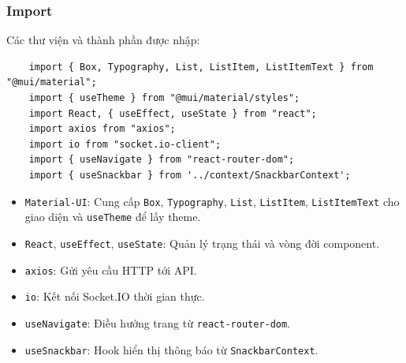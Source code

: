             \subsubsection{Import}
                \hspace*{0.6cm}Các thư viện và thành phần được nhập:
                \begin{lstlisting}
    import { Box, Typography, List, ListItem, ListItemText } from "@mui/material";
    import { useTheme } from "@mui/material/styles";
    import React, { useEffect, useState } from "react";
    import axios from "axios";
    import io from "socket.io-client";
    import { useNavigate } from "react-router-dom";
    import { useSnackbar } from '../context/SnackbarContext';
                \end{lstlisting}
                \begin{itemize}
                    \item \texttt{Material-UI}: Cung cấp \texttt{Box}, \texttt{Typography}, \texttt{List}, \texttt{ListItem}, \texttt{ListItemText} cho giao diện và \texttt{useTheme} để lấy theme.
                    \item \texttt{React}, \texttt{useEffect}, \texttt{useState}: Quản lý trạng thái và vòng đời component.
                    \item \texttt{axios}: Gửi yêu cầu HTTP tới API.
                    \item \texttt{io}: Kết nối Socket.IO thời gian thực.
                    \item \texttt{useNavigate}: Điều hướng trang từ \texttt{react-router-dom}.
                    \item \texttt{useSnackbar}: Hook hiển thị thông báo từ \texttt{SnackbarContext}.
                \end{itemize}

